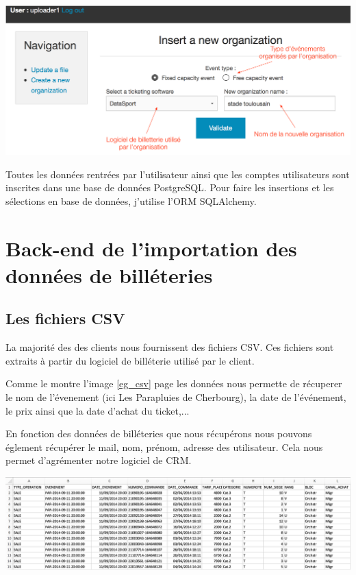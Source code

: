 \begin{center}
\includegraphics[scale=0.55]{images/front2.png}
\label{front_orga}
\end{center}

Toutes les données rentrées par l'utilisateur ainsi que les comptes utilisateurs sont inscrites dans une base de données PostgreSQL. Pour faire les insertions et les sélections en base de données, j'utilise l'ORM SQLAlchemy.

\section{Back-end de l'importation des données de billéteries}
\subsection{Les fichiers CSV}
La majorité des des clients nous fournissent des fichiers CSV. Ces fichiers sont extraits à partir du logiciel de billéterie utilisé par le client.

Comme le montre l'image \ref{eg_csv} page \pageref{eg_csv} les données nous permette de récuperer le nom de l'évenement (ici Les Parapluies de Cherbourg), la date de l'événement, le prix ainsi que la date d'achat du ticket,...

En fonction des données de billéteries que nous récupérons nous pouvons églement récupérer le mail, nom, prénom, adresse des utilisateur. Cela nous permet d'agrémenter notre logiciel de CRM. %

\begin{center}
\includegraphics[scale=0.45]{Images/eg_csv1}
\label{eg_csv}
\end{center}

